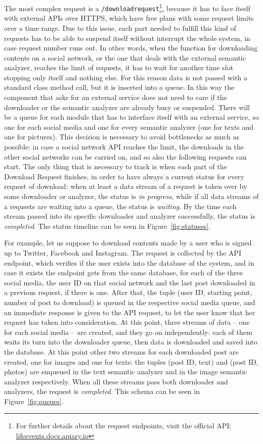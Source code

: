 The most complex request is a \texttt{/downloadrequest}\footnote{For further details about the request endpoints, visit the official API: \url{lifeevents.docs.apiary.io}}, because it has to face itself with external APIs over HTTPS, which have free plans with some request limits over a time range. Due to this issue, each part needed to fulfill this kind of requests has to be able to suspend itself without interrupt the whole system, in case request number runs out. In other words, when the function for downloading contents on a social network, or the one that deals with the external semantic analyzer, reaches the limit of requests, it has to wait for another time slot stopping only itself and nothing else. For this reason data is not passed with a standard class method call, but it is inserted into a queue. In this way the component that asks for an external service does not need to care if the downloader or the semantic analyzer are already busy or suspended. There will be a queue for each module that has to interface itself with an external service, so one for each social media and one for every semantic analyzer (one for texts and one for pictures). This decision is necessary to avoid bottlenecks as much as possible: in case a social network API reaches the limit, the downloads in the other social networks can be carried on, and so also the following requests can start. The only thing that is necessary to track is when each part of the Download Request finishes, in order to have always a current status for every request of download: when at least a data stream of a request is taken over by some downloader or analyzer, the status is \emph{in progress}, while if all data streams of a requests are waiting into a queue, the status is \emph{waiting}. By the time each stream passed into its specific downloader and analyzer successfully, the status is \emph{completed}. The status timeline can be seen in Figure~\ref{fig:statuses}.

For example, let us suppose to download contents made by a user who is signed up to Twitter, Facebook and Instagram. The request is collected by the API endpoint, which verifies if the user exists into the database of the system, and in case it exists the endpoint gets from the same database, for each of the three social media, the user ID on that social network and the last post downloaded in a previous request, if there is one. After that, the tuple (user ID, starting point, number of post to download) is queued in the respective social media queue, and an immediate response is given to the API request, to let the user know that her request has taken into consideration. At this point, three streams of data -- one for each social media -- are created, and they go on independently: each of them waits its turn into the downloader queue, then data is downloaded and saved into the database. At this point other two streams for each downloaded post are created, one for images and one for texts: the tuples (post ID, text) and (post ID, photos) are enqueued in the text semantic analyzer and in the image semantic analyzer respectively. When all these streams pass both downloader and analyzers, the request is \emph{completed}. This schema can be seen in Figure~\ref{fig:queues}.

